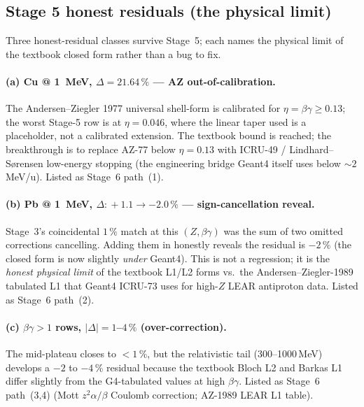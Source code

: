 \subsection{Stage 5 honest residuals (the physical limit)}
\label{app:bethe-stage5-residual}

Three honest-residual classes survive Stage~5; each names the physical
limit of the textbook closed form rather than a bug to fix.

\paragraph{(a) Cu @ \SI{1}{MeV}, $\Delta\!=\!21.64\,\%$ ---
AZ out-of-calibration.} The Andersen--Ziegler 1977 universal shell-form
is calibrated for $\eta\!=\!\beta\gamma\!\ge\!0.13$; the worst Stage-5
row is at $\eta\!=\!0.046$, where the linear taper used is a
placeholder, not a calibrated extension. The textbook bound is reached;
the breakthrough is to replace AZ-77 below $\eta\!=\!0.13$ with
ICRU-49 / Lindhard--Sørensen low-energy stopping (the engineering bridge
Geant4 itself uses below $\sim\!2$\,MeV/u). Listed as Stage~6 path~(1).

\paragraph{(b) Pb @ \SI{1}{MeV}, $\Delta\!:\!+1.1 \to -2.0\,\%$ ---
sign-cancellation reveal.} Stage~3's coincidental $1\,\%$ match at this
$(Z, \beta\gamma)$ was the sum of two omitted corrections cancelling.
Adding them in honestly reveals the residual is $-2\,\%$ (the closed
form is now slightly \emph{under} Geant4). This is not a regression; it
is the \emph{honest physical limit} of the textbook L1/L2 forms vs.\ the
Andersen--Ziegler-1989 tabulated L1 that Geant4 ICRU-73 uses for high-$Z$
LEAR antiproton data. Listed as Stage~6 path~(2).

\paragraph{(c) $\beta\gamma\!>\!1$ rows, $|\Delta|\!=\!1$--$4\,\%$
(over-correction).} The mid-plateau closes to $<\!1\,\%$, but the
relativistic tail (300--1000\,MeV) develops a $-2$ to $-4\,\%$ residual
because the textbook Bloch L2 and Barkas L1 differ slightly from the
G4-tabulated values at high $\beta\gamma$. Listed as Stage~6 path~(3,4)
(Mott $z^2\alpha/\beta$ Coulomb correction; AZ-1989 LEAR L1 table).

